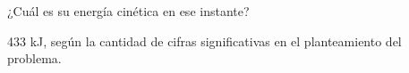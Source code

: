 ¿Cuál es su energía cinética en ese instante?


\begin{solutionbox}{1.5cm}
    433 kJ, según la cantidad de cifras significativas en el planteamiento del
    problema.
\end{solutionbox}
